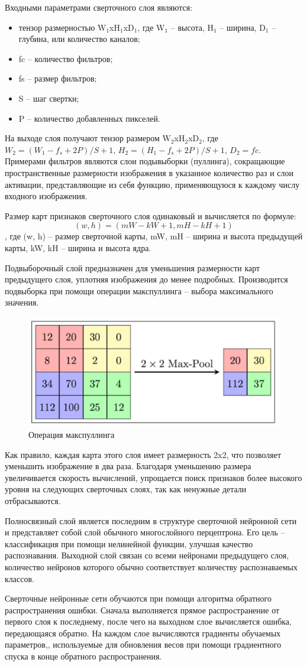 Входными параметрами сверточного слоя являются:
\begin{itemize}
	\item тензор размерностью W$_{1}$xH$_{1}$xD$_{1}$, где W$_{1}$ -- высота, H$_{1}$ -- ширина, D$_{1}$ -- глубина, или количество каналов;
	\item fc -- количество фильтров;
	\item fs -- размер фильтров; 
	\item S -- шаг свертки;
	\item P -- количество добавленных пикселей.
\end{itemize}
На выходе слоя получают тензор размером W$_{2}$xH$_{2}$xD$_{2}$, где $W_2 = (W_1 - f_s + 2P)/S + 1$, $H_2 = (H_1 - f_s + 2P)/S + 1$, $D_2 = fc$. Примерами фильтров являются слои подывыборки (пуллинга), сокращающие пространственные размерности изображения в указанное количество раз и слои активации, представляющие из себя функцию, применяющуюся к каждому числу входного	изображения.

Размер карт признаков сверточного слоя одинаковый и вычисляется по формуле:
\[
(w, h) = (mW - kW + 1, mH - kH + 1)
\],
где (w, h) -- размер сверточной карты, mW, mH -- ширина и высота предыдущей карты, kW, kH -- ширина и высота ядра.

Подвыборочный слой предназначен для уменьшения размерности карт предыдущего слоя, уплотняя изображения до менее подробных. Производится подвыборка при помощи операции макспуллинга -- выбора максимального значения.
\begin{figure}[H]
	\centering
	\includegraphics[width=0.7\linewidth]{images/maxpooling}
	\caption{Операция макспуллинга}
	\label{fig:maxpooling}
\end{figure}
Как правило, каждая карта этого слоя имеет размерность 2x2, что позволяет уменьшить изображение в два раза. Благодаря уменьшению размера увеличивается скорость вычислений, упрощается поиск признаков более высокого уровня на следующих сверточных слоях, так как ненужные детали отбрасываются.

Полносвязный слой является последним в структуре сверточной нейронной сети и представляет собой слой обычного многослойного перцептрона. Его цель -- классификация при помощи нелинейной функции, улучшая качество распознавания. Выходной слой связан со всеми нейронами предыдущего слоя, количество нейронов которого обычно соответствует количеству распознаваемых классов. 

Сверточные нейронные сети обучаются при помощи алгоритма обратного распространения ошибки. Сначала выполняется прямое распространение от первого слоя к последнему, после чего на выходном слое вычисляется ошибка, передающаяся обратно. На каждом слое вычисляются градиенты обучаемых параметров,, используемые для обновления весов при помощи градиентного спуска в конце обратного распространения.